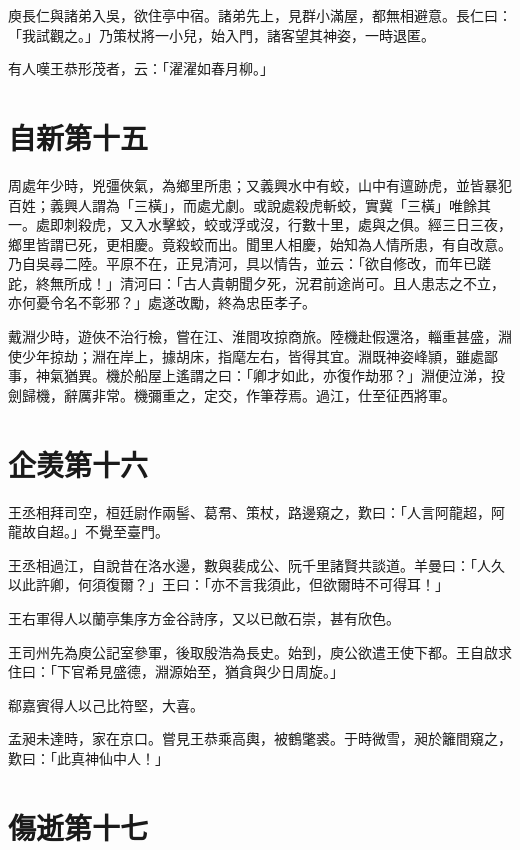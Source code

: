 庾長仁與諸弟入吳，欲住亭中宿。諸弟先上，見群小滿屋，都無相避意。長仁曰：「我試觀之。」乃策杖將一小兒，始入門，諸客望其神姿，一時退匿。

有人嘆王恭形茂者，云：「濯濯如春月柳。」



\chapter{自新第十五}

周處年少時，兇彊俠氣，為鄉里所患；又義興水中有蛟，山中有邅跡虎，並皆暴犯百姓；義興人謂為「三橫」，而處尤劇。或說處殺虎斬蛟，實冀「三橫」唯餘其一。處即刺殺虎，又入水擊蛟，蛟或浮或沒，行數十里，處與之俱。經三日三夜，鄉里皆謂已死，更相慶。竟殺蛟而出。聞里人相慶，始知為人情所患，有自改意。乃自吳尋二陸。平原不在，正見清河，具以情告，並云：「欲自修改，而年已蹉跎，終無所成！」清河曰：「古人貴朝聞夕死，況君前途尚可。且人患志之不立，亦何憂令名不彰邪？」處遂改勵，終為忠臣孝子。

戴淵少時，遊俠不治行檢，嘗在江、淮間攻掠商旅。陸機赴假還洛，輜重甚盛，淵使少年掠劫；淵在岸上，據胡床，指麾左右，皆得其宜。淵既神姿峰頴，雖處鄙事，神氣猶異。機於船屋上遙謂之曰：「卿才如此，亦復作劫邪？」淵便泣涕，投劍歸機，辭厲非常。機彌重之，定交，作筆荐焉。過江，仕至征西將軍。



\chapter{企羡第十六}

王丞相拜司空，桓廷尉作兩髻、葛帬、策杖，路邊窺之，歎曰：「人言阿龍超，阿龍故自超。」不覺至臺門。

王丞相過江，自說昔在洛水邊，數與裴成公、阮千里諸賢共談道。羊曼曰：「人久以此許卿，何須復爾？」王曰：「亦不言我須此，但欲爾時不可得耳！」

王右軍得人以蘭亭集序方金谷詩序，又以已敵石崇，甚有欣色。

王司州先為庾公記室參軍，後取殷浩為長史。始到，庾公欲遣王使下都。王自啟求住曰：「下官希見盛德，淵源始至，猶貪與少日周旋。」

郗嘉賓得人以己比符堅，大喜。

孟昶未達時，家在京口。嘗見王恭乘高輿，被鶴氅裘。于時微雪，昶於籬間窺之，歎曰：「此真神仙中人！」



\chapter{傷逝第十七}

